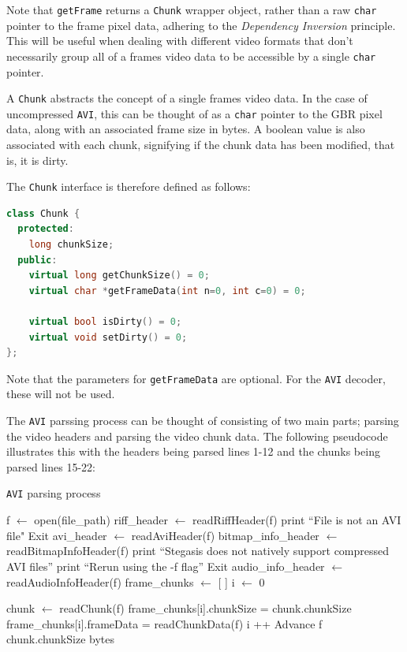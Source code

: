 \documentclass[paper=a4, fontsize=11pt,twoside]{scrartcl}    %
\numberwithin{table}{section}
\numberwithin{figure}{section}
\numberwithin{algorithm}{section}
\begin{document}
\noindent
Note that \texttt{getFrame} returns a \texttt{Chunk} wrapper object, rather than a raw \texttt{char} pointer to the frame pixel data, adhering to the \textit{Dependency Inversion} principle. This will be useful when dealing with different video formats that don't necessarily group all of a frames video data to be accessible by a single \texttt{char} pointer.

A \texttt{Chunk} abstracts the concept of a single frames video data. In the case of uncompressed \texttt{AVI}, this can be thought of as a \texttt{char} pointer to the GBR pixel data, along with an associated frame size in bytes. A boolean value is also associated with each chunk, signifying if the chunk data has been modified, that is, it is dirty.

The \texttt{Chunk} interface is therefore defined as follows:

\begin{lstlisting}[language=C++, caption={Chunk interface (\texttt{video/video\_decoder.h:4})}, frame=single]
class Chunk {
  protected:
    long chunkSize;
  public:
    virtual long getChunkSize() = 0;
    virtual char *getFrameData(int n=0, int c=0) = 0;
   
    virtual bool isDirty() = 0;
    virtual void setDirty() = 0;
};
\end{lstlisting}

\noindent
Note that the parameters for \texttt{getFrameData} are optional. For the \texttt{AVI} decoder, these will not be used.

The \texttt{AVI} parssing process can be thought of consisting of two main parts; parsing the video headers and parsing the video chunk data. The following pseudocode illustrates this with the headers being parsed lines 1-12 and the chunks being parsed lines 15-22: 

\begin{algorithm}
\caption{\texttt{AVI} parsing process}
\label{parseavi}
\begin{algorithmic}[1]
\State f $\gets$ open(file\_path)
\State riff\_header $\gets$ readRiffHeader(f)
	\State print ``File is not an AVI file"
	\State Exit
\EndIf
\State avi\_header $\gets$ readAviHeader(f)
\State bitmap\_info\_header $\gets$ readBitmapInfoHeader(f)
	\State print ``Stegasis does not natively support compressed AVI files''
	\State print ``Rerun using the -f flag''
	\State Exit
\EndIf
\State audio\_info\_header $\gets$ readAudioInfoHeader(f)
\State frame\_chunks $\gets$ [ ]
\State i $\gets$ 0

	\State chunk $\gets$ readChunk(f)
		\State frame\_chunks[i].chunkSize = chunk.chunkSize
		\State frame\_chunks[i].frameData = readChunkData(f)
		\State i ++
	\Else
		\State Advance f chunk.chunkSize bytes
	\EndIf
\EndWhile
\end{algorithmic}
\end{algorithm}
\end{document}
